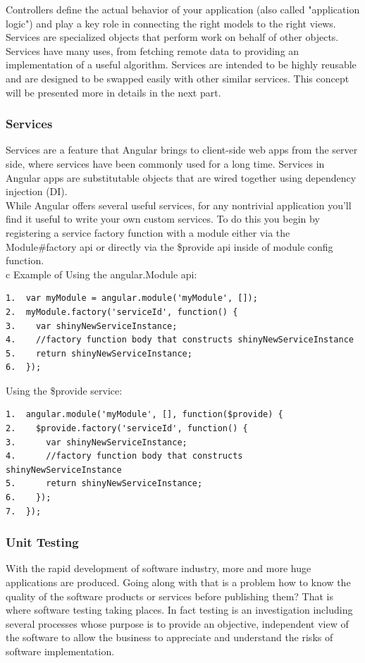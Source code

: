 \documentclass[14pt,a4paper]{extreport}
\begin{document}
Controllers define the actual behavior of your application (also called "application logic") and play a key role in connecting the right models to the right views.
\\

Services are specialized objects that perform work on behalf of other objects. Services have many uses, from fetching remote data to providing an implementation of a useful algorithm. Services are intended to be highly reusable and are designed to be swapped easily with other similar services. This concept will be presented more in details in the next part.

			\subsubsection{Services}
			Services are a feature that Angular brings to client-side web apps from the server side, where services have been commonly used for a long time. Services in Angular apps are substitutable objects that are wired together using dependency injection (DI).
\\
			
While Angular offers several useful services, for any nontrivial application you'll find it useful to write your own custom services. To do this you begin by registering a service factory function with a module either via the Module\#factory api or directly via the \$provide api inside of module config function.
\\
c
Example of Using the angular.Module api:
\begin{verbatim}
1.	var myModule = angular.module('myModule', []);
2.	myModule.factory('serviceId', function() {
3.	  var shinyNewServiceInstance;
4.	  //factory function body that constructs shinyNewServiceInstance
5.	  return shinyNewServiceInstance;
6.	});
\end{verbatim}
Using the \$provide service:
\begin{verbatim}
1.	angular.module('myModule', [], function($provide) {
2.	  $provide.factory('serviceId', function() {
3.	    var shinyNewServiceInstance;
4.	    //factory function body that constructs shinyNewServiceInstance
5.	    return shinyNewServiceInstance;
6.	  });
7.	});
\end{verbatim}


			\subsubsection{Unit Testing}
			With the rapid development of software industry, more and more huge applications are produced. Going along with that is a problem how to know the quality of the software products or services before publishing them? That is where software testing taking places. In fact testing is an investigation including several processes whose purpose is to provide an objective, independent view of the software to allow the business to appreciate and understand the risks of software implementation\cite{test}.
\\
\end{document}
